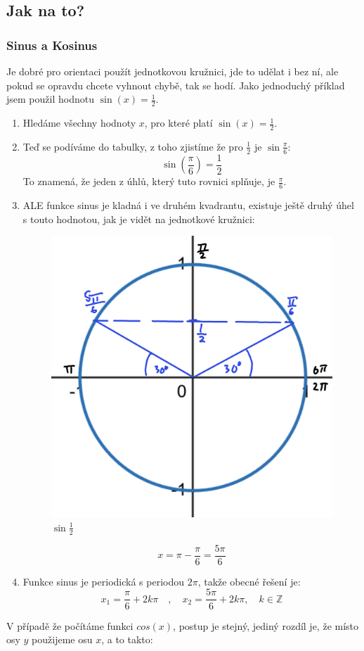 \subsection{Jak na to?}
\subsubsection{Sinus a Kosinus}
Je dobré pro orientaci použít jednotkovou kružnici, jde to udělat i bez ní, ale pokud se opravdu chcete vyhnout chybě, tak se hodí. Jako jednoduchý příklad jsem použil hodnotu $\sin(x) = \frac{1}{2}$.
\begin{enumerate}
    \item Hledáme všechny hodnoty $x$, pro které platí $\sin(x) = \frac{1}{2}$.
    
    \item Teď se podíváme do tabulky, z toho zjistíme že pro $\frac{1}{2}$ je $\sin{\frac{\pi}{6}}$:
    \[
    \sin\left(\frac{\pi}{6}\right) = \frac{1}{2}
    \]
    To znamená, že jeden z úhlů, který tuto rovnici splňuje, je $\frac{\pi}{6}$.

    \item ALE funkce sinus je kladná i ve druhém kvadrantu, existuje ještě druhý úhel s touto hodnotou, jak je vidět na jednotkové kružnici:
    \begin{figure}[H]
        \centering
        \includegraphics[width=0.4\linewidth]{img/7_JednotkovaKruzniceSinpolovina.png}
        \caption{$\sin{\frac{1}{2}}$} 
        \label{fig:Sinus jedné poloviny na jednotkové kružnici}
\end{figure}
    \[
    x = \pi - \frac{\pi}{6} = \frac{5\pi}{6}
    \]

    \item Funkce sinus je periodická s periodou $2\pi$, takže obecné řešení je:
    \[
    x_1 = \frac{\pi}{6} + 2k\pi \quad, \quad x_2 = \frac{5\pi}{6} + 2k\pi, \quad k \in \mathbb{Z}
    \]
\end{enumerate}
V případě že počítáme funkci $cos(x)$, postup je stejný, jediný rozdíl je, že místo osy $y$ použijeme osu $x$, a to takto:
